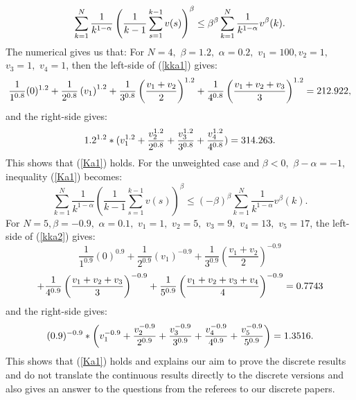 \documentclass[a4paper]{amsart}
\theoremstyle{plain}
\numberwithin{equation}{section}
\begin{document}
\begin{equation}
\sum_{k=1}^{N}\frac{1}{k^{1-\alpha }}\left( \frac{1}{k-1}%
\sum_{s=1}^{k-1}v(s)\right) ^{\beta }\leq \beta ^{\beta }\sum_{k=1}^{N}\frac{%
1}{k^{1-\alpha }}v^{\beta }(k).  \label{kka1}
\end{equation}%
The numerical gives us that: For $N=4,$ $\beta =1.2,$ $\alpha =0.2,$ $%
v_{1}=100,v_{2}=1,$ $v_{3}=1,$ $v_{4}=1$, then the left-side of (\ref{kka1})
gives:%
\begin{equation*}
\frac{1}{1^{0.8}}(0)^{1.2}+\frac{1}{2^{0.8}}\left( v_{1}\right) ^{1.2}+\frac{%
1}{3^{0.8}}\left( \frac{v_{1}+v_{2}}{2}\right) ^{1.2}+\frac{1}{4^{0.8}}%
\left( \frac{v_{1}+v_{2}+v_{3}}{3}\right) ^{1.2}=212.922,
\end{equation*}%
and the right-side gives:%
\begin{equation*}
1.2^{1.2}\ast (v_{1}^{1.2}+\frac{v_{2}^{1.2}}{2^{0.8}}+\frac{v_{3}^{1.2}}{%
3^{0.8}}+\frac{v_{4}^{1.2}}{4^{0.8}})=314.263.
\end{equation*}%
This shows that (\ref{Ka1}) holds. For the unweighted case and $\beta <0,$ $%
\beta -\alpha =-1$, inequality (\ref{Ka1}) becomes:%
\begin{equation}
\sum_{k=1}^{N}\frac{1}{k^{1-\alpha }}\left( \frac{1}{k-1}%
\sum_{s=1}^{k-1}v(s)\right) ^{\beta }\leq \left( -\beta \right) ^{\beta
}\sum_{k=1}^{N}\frac{1}{k^{1-\alpha }}v^{\beta }(k).  \label{kka2}
\end{equation}%
For $N=5,\beta =-0.9,$ $\alpha =0.1,$ $v_{1}=1,$ $v_{2}=5,$ $v_{3}=9,$ $%
v_{4}=13,$ $v_{5}=17$, the left-side of (\ref{kka2}) gives:%
\begin{equation*}
\frac{1}{1^{0.9}}(0)^{0.9}+\frac{1}{2^{0.9}}\left( v_{1}\right) ^{-0.9}+%
\frac{1}{3^{0.9}}\left( \frac{v_{1}+v_{2}}{2}\right) ^{-0.9}
\end{equation*}%
\begin{equation*}
+\frac{1}{4^{0.9}}\left( \frac{v_{1}+v_{2}+v_{3}}{3}\right) ^{-0.9}+\frac{1}{%
5^{0.9}}\left( \frac{v_{1}+v_{2}+v_{3}+v_{4}}{4}\right) ^{-0.9}=0.7743
\end{equation*}%
and the right-side gives:%
\begin{equation*}
(0.9)^{-0.9}\ast \left( v_{1}^{-0.9}+\frac{v_{2}^{-0.9}}{2^{0.9}}+\frac{%
v_{3}^{-0.9}}{3^{0.9}}+\frac{v_{4}^{-0.9}}{4^{0.9}}+\frac{v_{5}^{-0.9}}{%
5^{0.9}}\right) =1.3516.
\end{equation*}%
This shows that (\ref{Ka1}) holds and explains our aim to prove the discrete
results and do not translate the continuous results directly to the discrete
versions and also gives an answer to the questions from the referees to our
discrete papers.
\end{document}
